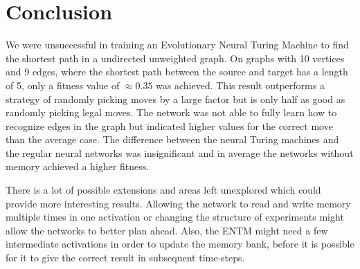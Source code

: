 
\section{Conclusion}
We were unsuccessful in training an Evolutionary Neural Turing Machine to find the shortest path in a undirected unweighted graph. On graphs with 10 vertices and 9 edges, where the shortest path between the source and target has a length of 5, only a fitness value of $\approx0.35 $ was achieved. This result outperforms a strategy of randomly picking moves by a large factor but is only half as good as randomly picking legal moves. The network was not able to fully learn how to recognize edges in the graph but indicated higher values for the correct move than the average case. 
The difference between the neural Turing machines and the regular neural networks was insignificant and in average the networks without memory achieved a higher fitness. 

\newpar There is a lot of possible extensions and areas left unexplored which could provide more interesting results. Allowing the network to read and write memory multiple times in one activation or changing the structure of experiments might allow the networks to better plan ahead. Also, the ENTM might need a few intermediate activations in order to update the memory bank, before it is possible for it to give the correct result in subsequent time-steps.